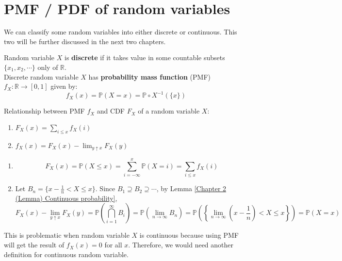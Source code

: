 \documentclass{huhtakm-template-book}
\newcommand{\prob}{\mathbb{P}}
\begin{document}
\section{PMF / PDF of random variables}
We can classify some random variables into either discrete or continuous. This two will be further discussed in the next two chapters.
\begin{defn}
	Random variable $X$ is \textbf{discrete} if it takes value in some countable subsets $\{x_{1},x_{2},\cdots\}$ only of $\mathbb{R}$.\\
	Discrete random variable $X$ has \textbf{probability mass function} (PMF) $f_{X}:\mathbb{R}\to [0,1]$ given by: 
	\begin{equation*}
		f_{X}(x)=\prob(X=x)=\prob\circ X^{-1}(\{x\})
	\end{equation*}
\end{defn}
\begin{lem}
	\label{Chapter 3 (Lemma) Relationship between pmf and cdf}
	Relationship between PMF $f_{X}$ and CDF $F_{X}$ of a random variable $X$:
	\begin{enumerate}
		\item $F_{X}(x)=\sum_{i\leq x}f_{X}(i)$
		\item $f_{X}(x)=F_{X}(x)-\lim_{y\uparrow x}F_{X}(y)$
	\end{enumerate}
\end{lem}
\begin{proofing}
	\begin{enumerate}
		\item 
		\begin{equation*}
			F_{X}(x)=\prob(X\leq x)=\sum_{i=-\infty}^{x}\prob(X=i)=\sum_{i\leq x}f_{X}(i)
		\end{equation*}
		\item Let $B_{n}=\{x-\frac{1}{n}<X\leq x\}$. Since $B_{1}\supseteq B_{2}\supseteq\cdots$, by Lemma \ref{Chapter 2 (Lemma) Continuous probability},
		\begin{equation*}
			F_{X}(x)-\lim_{y\uparrow x}F_{X}(y)=\prob\left(\bigcap_{i=1}^{\infty}B_{i}\right)=\prob\left(\lim_{n\to\infty}B_{n}\right)=\prob\left(\left\{\lim_{n\to\infty}\left(x-\frac{1}{n}\right)<X\leq x\right\}\right)=\prob(X=x)
		\end{equation*}
	\end{enumerate}
\end{proofing}
This is problematic when random variable $X$ is continuous because using PMF will get the result of $f_{X}(x)=0$ for all $x$. Therefore, we would need another definition for continuous random variable.
\end{document}
